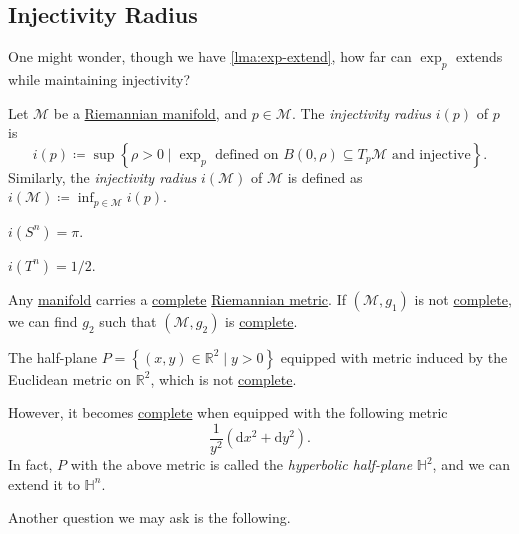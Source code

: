 \subsection{Injectivity Radius}
One might wonder, though we have \autoref{lma:exp-extend}, how far can \(\exp _p\) extends while maintaining injectivity?

\begin{definition}\label{def:injectivity-radius}
	Let \(\mathcal{M} \) be a \hyperref[def:Riemannian-manifold]{Riemannian manifold}, and \(p\in \mathcal{M} \). The \emph{injectivity radius} \(i(p)\) of \(p\) is
	\[
		i(p) \coloneqq \sup \left\{ \rho > 0 \mid \exp _p \text{ defined on \(B(0, \rho ) \subseteq T_p \mathcal{M} \) and injective} \right\}.
	\]
	Similarly, the \emph{injectivity radius} \(i(\mathcal{M} )\) of \(\mathcal{M} \) is defined as \(i(\mathcal{M} )\coloneqq \inf _{p\in \mathcal{M} }i(p)\).
\end{definition}

\begin{eg}[Sphere]
	\(i(S^n) = \pi \).
\end{eg}

\begin{eg}[Torus]
	\(i(T^n) = 1 / 2\).
\end{eg}

\begin{remark}
	Any \hyperref[def:smooth-manifold]{manifold} carries a \hyperref[def:geodesically-complete]{complete} \hyperref[def:Riemannian-metric]{Riemannian metric}. If \((\mathcal{M} , g_1)\) is not \hyperref[def:geodesically-complete]{complete}, we can find \(g_2\) such that \((\mathcal{M} , g_2)\) is \hyperref[def:geodesically-complete]{complete}.
\end{remark}

\begin{eg}
	The half-plane \(P=\left\{ (x, y)\in \mathbb{R} ^2 \mid y > 0 \right\}\) equipped with metric induced by the Euclidean metric on \(\mathbb{R} ^2\), which is not \hyperref[def:geodesically-complete]{complete}.

	However, it becomes \hyperref[def:geodesically-complete]{complete} when equipped with the following metric
	\[
		\frac{1}{y^2} (\mathrm{d} x^2 + \mathrm{d} y^2).
	\]
	In fact, \(P\) with the above metric is called the \emph{hyperbolic half-plane} \(\mathbb{H} ^2\), and we can extend it to \(\mathbb{H} ^n \).
\end{eg}

Another question we may ask is the following.


